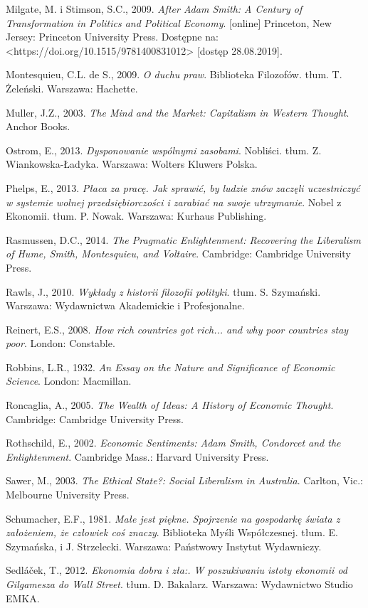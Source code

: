 \documentclass[a4paper]{article}
\begin{document}
Milgate, M. i Stimson, S.C., 2009. \textit{After Adam Smith: A Century of Transformation in Politics and Political Economy}. [online] Princeton, New Jersey: Princeton University Press. Dostępne na: {\textless}https://doi.org/10.1515/9781400831012{\textgreater} [dostęp 28.08.2019].

Montesquieu, C.L. de S., 2009. \textit{O duchu praw}. Biblioteka Filozofów. tłum. T. Żeleński. Warszawa: Hachette.

Muller, J.Z., 2003. \textit{The Mind and the Market: Capitalism in Western Thought}. Anchor Books.

Ostrom, E., 2013. \textit{Dysponowanie wspólnymi zasobami}. Nobliści. tłum. Z. Wiankowska-Ładyka. Warszawa: Wolters Kluwers Polska.

Phelps, E., 2013. \textit{Płaca za pracę. Jak sprawić, by ludzie znów zaczęli uczestniczyć w systemie wolnej przedsiębiorczości i zarabiać na swoje utrzymanie}. Nobel z Ekonomii. tłum. P. Nowak. Warszawa: Kurhaus Publishing.

Rasmussen, D.C., 2014. \textit{The Pragmatic Enlightenment: Recovering the Liberalism of Hume, Smith, Montesquieu, and Voltaire}. Cambridge: Cambridge University Press.

Rawls, J., 2010. \textit{Wykłady z historii filozofii polityki}. tłum. S. Szymański. Warszawa: Wydawnictwa Akademickie i Profesjonalne.

Reinert, E.S., 2008. \textit{How rich countries got rich... and why poor countries stay poor}. London: Constable.

Robbins, L.R., 1932. \textit{An Essay on the Nature and Significance of Economic Science}. London: Macmillan.

Roncaglia, A., 2005. \textit{The Wealth of Ideas: A History of Economic Thought}. Cambridge: Cambridge University Press.

Rothschild, E., 2002. \textit{Economic Sentiments: Adam Smith, Condorcet and the Enlightenment}. Cambridge Mass.: Harvard University Press.

Sawer, M., 2003. \textit{The Ethical State?: Social Liberalism in Australia}. Carlton, Vic.: Melbourne University Press.

Schumacher, E.F., 1981. \textit{Małe jest piękne. Spojrzenie na gospodarkę świata z założeniem, że człowiek coś znaczy}. Biblioteka Myśli Współczesnej. tłum. E. Szymańska, i J. Strzelecki. Warszawa: Państwowy Instytut Wydawniczy.

Sedláček, T., 2012. \textit{Ekonomia dobra i zła:. W poszukiwaniu istoty ekonomii od Gilgamesza do Wall Street}. tłum. D. Bakalarz. Warszawa: Wydawnictwo Studio EMKA.
\end{document}

